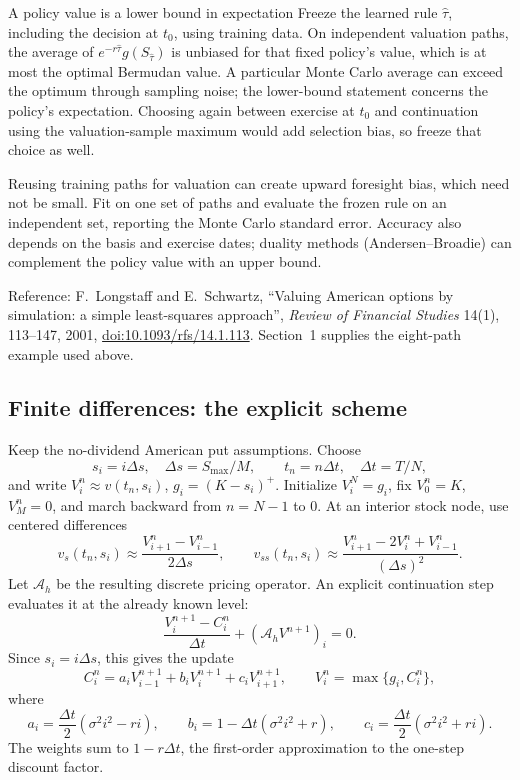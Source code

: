 \documentclass[10pt]{article}
\newcommand{\1}{\mathbf 1}
\theoremstyle{definition}
\begin{document}
\begin{warningbox}{A policy value is a lower bound in expectation}
Freeze the learned rule \(\widehat\tau\), including the decision at
\(t_0\), using training data. On independent valuation paths, the average
of \(e^{-r\widehat\tau}g(S_{\widehat\tau})\) is unbiased for that fixed
policy's value, which is at most the optimal Bermudan value. A particular
Monte Carlo average can exceed the optimum through sampling noise; the
lower-bound statement concerns the policy's expectation. Choosing again
between exercise at \(t_0\) and continuation using the valuation-sample
maximum would add selection bias, so freeze that choice as well.

Reusing training paths for valuation can create upward foresight bias,
which need not be small. Fit on one set of paths and evaluate the frozen
rule on an independent set, reporting the Monte Carlo standard error.
Accuracy also depends on the basis and exercise dates; duality methods
(Andersen--Broadie) can complement the policy value with an upper bound.
\end{warningbox}

{\footnotesize Reference: F.~Longstaff and E.~Schwartz, ``Valuing American
options by simulation: a simple least-squares approach'', \emph{Review of
Financial Studies} 14(1), 113--147, 2001,
\href{https://doi.org/10.1093/rfs/14.1.113}{doi:10.1093/rfs/14.1.113}.
Section~1 supplies the eight-path example used above.\par}

\subsection{Finite differences: the explicit scheme}

Keep the no-dividend American put assumptions. Choose
\[
s_i=i\Delta s,\quad \Delta s=S_{\max}/M,\qquad
t_n=n\Delta t,\quad \Delta t=T/N,
\]
and write \(V_i^n\approx v(t_n,s_i)\), \(g_i=(K-s_i)^+\).
Initialize \(V_i^N=g_i\), fix \(V_0^n=K\), \(V_M^n=0\), and march
backward from \(n=N-1\) to \(0\). At an interior stock node, use centered
differences
\[
v_s(t_n,s_i)\approx\frac{V_{i+1}^n-V_{i-1}^n}{2\Delta s},\qquad
v_{ss}(t_n,s_i)\approx
\frac{V_{i+1}^n-2V_i^n+V_{i-1}^n}{(\Delta s)^2}.
\]
Let \(\mathcal A_h\) be the resulting discrete pricing operator.
An explicit continuation step evaluates it at the already known level:
\[
\frac{V_i^{n+1}-C_i^n}{\Delta t}
+(\mathcal A_hV^{n+1})_i=0.
\]
Since \(s_i=i\Delta s\), this gives the update
\[
\boxed{
C_i^n=a_iV_{i-1}^{n+1}+b_iV_i^{n+1}+c_iV_{i+1}^{n+1},\qquad
V_i^n=\max\{g_i,C_i^n\},}
\]
where
\[
a_i=\frac{\Delta t}{2}(\sigma^2i^2-ri),\qquad
b_i=1-\Delta t(\sigma^2i^2+r),\qquad
c_i=\frac{\Delta t}{2}(\sigma^2i^2+ri).
\]
The weights sum to \(1-r\Delta t\), the first-order approximation to the
one-step discount factor.
\end{document}
